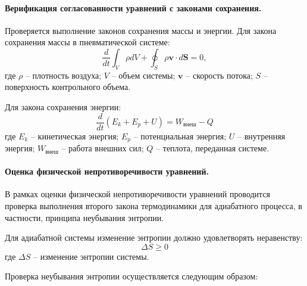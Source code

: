 \paragraph{Верификация согласованности уравнений с законами сохранения.}

Проверяется выполнение законов сохранения массы и энергии. Для закона сохранения массы в пневматической системе:
\begin{equation*}
    \frac{d}{dt}\int_V \rho dV + \oint_S \rho \mathbf{v} \cdot d\mathbf{S} = 0,
\end{equation*}
где $\rho$ -- плотность воздуха; $V$ -- объем системы; $\mathbf{v}$ -- скорость потока; $S$ -- поверхность контрольного объема.

Для закона сохранения энергии:
\begin{equation*}
    \frac{d}{dt}(E_k + E_p + U) = W_{\text{внеш}} - Q
\end{equation*}
где $E_k$ -- кинетическая энергия;
$E_p$ -- потенциальная энергия;
$U$ -- внутренняя энергия;
$W_{\text{внеш}}$ -- работа внешних сил;
$Q$ -- теплота, переданная системе.

\paragraph{Оценка физической непротиворечивости уравнений.}

В рамках оценки физической непротиворечивости уравнений проводится проверка
выполнения второго закона термодинамики для адиабатного процесса, в частности, принципа неубывания энтропии.

Для адиабатной системы изменение энтропии должно удовлетворять неравенству:
\begin{equation*}
    \Delta S \geq 0
\end{equation*}
где $\Delta S$ -- изменение энтропии системы.

Проверка неубывания энтропии осуществляется следующим образом:

